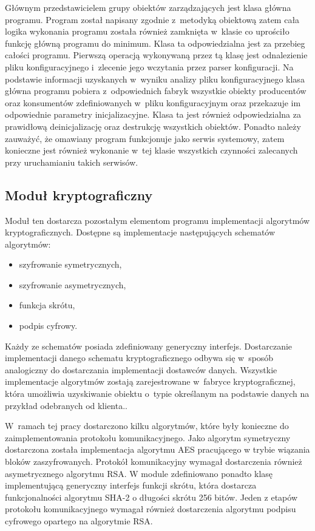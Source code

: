 Głównym przedstawicielem grupy obiektów zarządzających jest klasa główna
programu. Program został napisany zgodnie z~metodyką obiektową zatem
cała logika wykonania programu została również zamknięta w~klasie co
uprościło funkcję główną programu do minimum. Klasa ta odpowiedzialna
jest za przebieg całości programu. Pierwszą operacją wykonywaną przez
tą klasę jest odnalezienie pliku konfiguracyjnego i~zlecenie jego
wczytania przez parser konfiguracji. Na podstawie informacji
uzyskanych w~wyniku analizy pliku konfiguracyjnego klasa główna
programu pobiera z~odpowiednich fabryk wszystkie obiekty producentów
oraz konsumentów zdefiniowanych w~pliku konfiguracyjnym oraz
przekazuje im odpowiednie parametry inicjalizacyjne. Klasa ta jest
również odpowiedzialna za prawidłową deinicjalizację oraz destrukcję
wszystkich obiektów. Ponadto należy zauważyć, że omawiany program
funkcjonuje jako serwis systemowy, zatem konieczne jest również
wykonanie w~tej klasie wszystkich czynności zalecanych przy
uruchamianiu takich serwisów.

\subsection[Moduł kryptograficzny][Moduł kryptograficzny]{Moduł kryptograficzny}

Moduł ten dostarcza pozostałym elementom programu implementacji
algorytmów kryptograficznych. Dostępne są implementacje następujących
schematów algorytmów:

\begin{itemize}
\item szyfrowanie symetrycznych,
\item szyfrowanie asymetrycznych,
\item funkcja skrótu,
\item podpis cyfrowy.
\end{itemize}

Każdy ze schematów posiada zdefiniowany generyczny
interfejs. Dostarczanie implementacji danego schematu
kryptograficznego odbywa się w~sposób analogiczny do dostarczania
implementacji dostawców danych. Wszystkie implementacje algorytmów
zostają zarejestrowane w~fabryce kryptograficznej, która umożliwia
uzyskiwanie obiektu o~typie określanym na podstawie danych na przykład
odebranych od klienta..

W~ramach tej pracy dostarczono kilku algorytmów, które były konieczne
do zaimplementowania protokołu komunikacyjnego. Jako algorytm
symetryczny dostarczona została implementacja algorytmu AES
pracującego w trybie wiązania bloków zaszyfrowanych. Protokół
komunikacyjny wymagał dostarczenia również asymetrycznego algorytmu
RSA. W module zdefiniowano ponadto klasę implementującą generyczny
interfejs funkcji skrótu, która dostarcza funkcjonalności algorytmu
SHA-2 o długości skrótu 256 bitów. Jeden z etapów protokołu
komunikacyjnego wymagał również dostarczenia algorytmu podpisu
cyfrowego opartego na algorytmie RSA.


